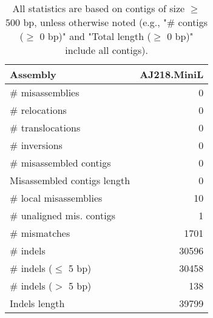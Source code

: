 \documentclass[12pt,a4paper]{article}
\begin{document}
\begin{table}[ht]
\begin{center}
\caption{All statistics are based on contigs of size $\geq$ 500 bp, unless otherwise noted (e.g., "\# contigs ($\geq$ 0 bp)" and "Total length ($\geq$ 0 bp)" include all contigs).}
\begin{tabular}{|l*{1}{|r}|}
\hline
Assembly & AJ218.MiniL \\ \hline
\# misassemblies & 0 \\ \hline
\hspace{5mm}\# relocations & 0 \\ \hline
\hspace{5mm}\# translocations & 0 \\ \hline
\hspace{5mm}\# inversions & 0 \\ \hline
\# misassembled contigs & 0 \\ \hline
Misassembled contigs length & 0 \\ \hline
\# local misassemblies & 10 \\ \hline
\# unaligned mis. contigs & 1 \\ \hline
\# mismatches & 1701 \\ \hline
\# indels & 30596 \\ \hline
\hspace{5mm}\# indels ($\leq$ 5 bp) & 30458 \\ \hline
\hspace{5mm}\# indels ($>$ 5 bp) & 138 \\ \hline
Indels length & 39799 \\ \hline
\end{tabular}
\end{center}
\end{table}
\end{document}
